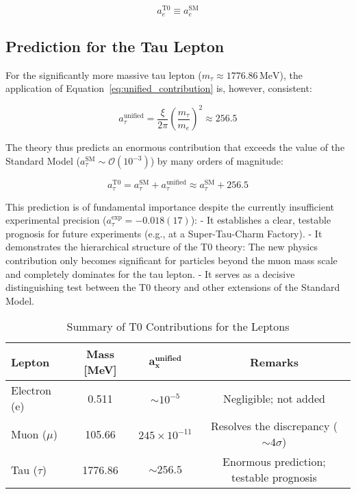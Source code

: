 \documentclass[12pt,a4paper]{article}
\begin{document}
\begin{thebibliography}{99}
\[
a_e^{\text{T0}} \equiv a_e^{\text{SM}}
\]
\subsection{Prediction for the Tau Lepton}

For the significantly more massive tau lepton (\(m_\tau \approx 1776.86 \, \text{MeV}\)), the application of Equation~\ref{eq:unified_contribution} is, however, consistent:

\[
a_\tau^{\text{unified}} = \frac{\xi}{2\pi} \left( \frac{m_\tau}{m_e} \right)^2 \approx 256.5
\]

The theory thus predicts an enormous contribution that exceeds the value of the Standard Model (\(a_\tau^{\text{SM}} \sim \mathcal{O}(10^{-3})\)) by many orders of magnitude:

\[
a_\tau^{\text{T0}} = a_\tau^{\text{SM}} + a_\tau^{\text{unified}} \approx a_\tau^{\text{SM}} + 256.5
\]

This prediction is of fundamental importance despite the currently insufficient experimental precision (\(a_\tau^{\text{exp}} = -0.018(17)\)):
- It establishes a clear, testable prognosis for future experiments (e.g., at a Super-Tau-Charm Factory).
- It demonstrates the hierarchical structure of the T0 theory: The new physics contribution only becomes significant for particles beyond the muon mass scale and completely dominates for the tau lepton.
- It serves as a decisive distinguishing test between the T0 theory and other extensions of the Standard Model.

\begin{table}[h]
	\centering
	\caption{Summary of T0 Contributions for the Leptons}
	\begin{tabular}{lccc}
		\hline
		\textbf{Lepton} & \textbf{Mass [MeV]} & \(\mathbf{a_x^{\text{unified}}}\) & \textbf{Remarks} \\
		\hline
		Electron (e)  & 0.511 & \(\sim 10^{-5}\) & Negligible; not added \\
		Muon ($\mu$)  & 105.66 & \(245 \times 10^{-11}\) & Resolves the discrepancy (\(\sim 4\sigma\)) \\
		Tau ($\tau$)  & 1776.86 & \(\sim 256.5\) & Enormous prediction; testable prognosis \\
		\hline
	\end{tabular}
	\end{table}

	\end{thebibliography}
	
\end{document}
